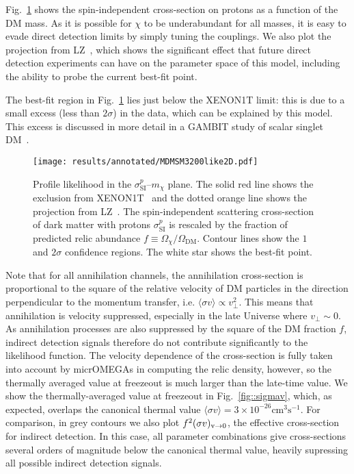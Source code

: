\documentclass[pdftex,twocolumn,epjc3_preprint,runningheads]{svjour3}
\renewcommand{\_}{\discretionary{\underscore}{}{\underscore}}
\newcommand{\gambit}{\textsf{GAMBIT}\xspace}
\newcommand{\GB}{\gambit}
\newcommand{\mo}{\micromegas}
\newcommand{\micromegas}{\textsf{micrOMEGAs}\xspace}
\begin{document}
Fig.~\ref{fig::cross_sec} shows the spin-independent cross-section on protons as a function of the DM mass. As it is possible for $\chi$ to be underabundant for all masses, it is easy to evade direct detection limits by simply tuning the couplings. We also plot the projection from LZ~\cite{LZ}, which shows the significant effect that future direct detection experiments can have on the parameter space of this model, including the ability to probe the current best-fit point.

The best-fit region in Fig.~\ref{fig::cross_sec} lies just below the XENON1T limit: this is due to a small excess (less than $2\sigma$) in the data, which can be explained by this model.  This excess is discussed in more detail in a \GB study of scalar singlet DM~\cite{SSDM2}.

\begin{figure}[tbp]
  \centering
  \texttt{[image: results/annotated/MDMSM\_3\_200\_like2D.pdf]}
  \vspace{-2mm}
  \caption{Profile likelihood in the $\sigma_\mathrm{SI}^p$--$m_\chi$ plane. The solid red line shows the exclusion from XENON1T~\cite{Aprile:2018dbl} and the dotted orange line shows the projection from LZ~\cite{LZ}. The spin-independent scattering cross-section of dark matter with protons $\sigma_\mathrm{SI}^p$ is rescaled by the fraction of predicted relic abundance $f\equiv\Omega_\chi/\Omega_{\mathrm{DM}}$. Contour lines show the $1$ and $2\sigma$ confidence regions. The white star shows the best-fit point.}
  \label{fig::cross_sec}
\end{figure}

Note that for all annihilation channels, the annihilation cross-section is proportional to the square of the relative velocity of DM particles in the direction perpendicular to the momentum transfer, i.e. $\langle \sigma v \rangle \varpropto v_{\perp}^2$.  This means that annihilation is velocity suppressed, especially in the late Universe where $v_{\perp} \sim 0$.  As annihilation processes are also suppressed by the square of the DM fraction $f$, indirect detection signals therefore do not contribute significantly to the likelihood function.  The velocity dependence of the cross-section is fully taken into account by \mo in computing the relic density, however, so the thermally averaged value at freezeout is much larger than the late-time value.  We show the thermally-averaged value at freezeout in Fig.~\ref{fig::sigmav}, which, as expected, overlaps the canonical thermal value $\langle \sigma v \rangle = 3 \times 10^{-26} \text{cm}^3\text{s}^{-1}$.  For comparison, in grey contours we also plot $f^2(\sigma v)_{\rm v \rightarrow 0}$, the effective cross-section for indirect detection.  In this case, all parameter combinations give cross-sections several orders of magnitude below the canonical thermal value, heavily supressing all possible indirect detection signals.
\end{document}
